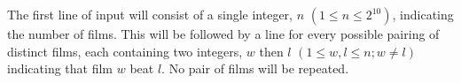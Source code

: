 The first line of input will consist of a single integer, $n$ $(1 \le n \le 2^{10})$,
indicating the number of films. This will be followed by a line for every possible
pairing of distinct films, each containing two integers, $w$ then $l$
$(1 \le w, l \le n; w \ne l)$ indicating that film $w$ beat $l$.
No pair of films will be repeated.
